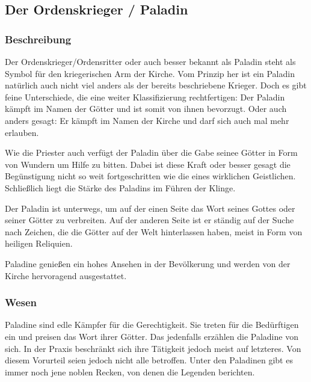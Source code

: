 \subsection{Der Ordenskrieger / Paladin}
\subsubsection{Beschreibung}
Der Ordenskrieger/Ordensritter oder auch besser bekannt als Paladin steht als Symbol für den kriegerischen 
Arm der Kirche. Vom Prinzip her ist ein Paladin natürlich auch nicht viel anders als der bereits beschriebene 
Krieger. Doch es gibt feine Unterschiede, die eine weiter Klassifizierung rechtfertigen: Der Paladin kämpft im 
Namen der Götter und ist somit von ihnen bevorzugt. Oder auch anders gesagt: Er kämpft im Namen der Kirche und 
darf sich auch mal mehr erlauben.
\par Wie die Priester auch verfügt der Paladin über die Gabe seinee Götter in Form von Wundern um Hilfe zu 
bitten. Dabei ist diese Kraft oder besser gesagt die Begünstigung nicht so weit fortgeschritten wie die eines 
wirklichen Geistlichen. Schließlich liegt die Stärke des Paladins im Führen der Klinge.
\par Der Paladin ist unterwegs, um auf der einen Seite das Wort seines Gottes oder seiner Götter zu verbreiten. 
Auf der anderen Seite ist er ständig auf der Suche nach Zeichen, die die Götter auf der Welt hinterlassen haben, 
meist in Form von heiligen Reliquien.
\par Paladine genießen ein hohes Ansehen in der Bevölkerung und werden von der Kirche hervoragend ausgestattet.
\subsubsection{Wesen}
\par Paladine sind edle Kämpfer für die Gerechtigkeit. Sie treten für die Bedürftigen ein und preisen das 
Wort ihrer Götter. Das jedenfalls erzählen die Paladine von sich. In der Praxis beschränkt sich ihre Tätigkeit 
jedoch meist auf letzteres. Von diesem Vorurteil seien jedoch nicht alle betroffen. Unter den Paladinen gibt es 
immer noch jene noblen Recken, von denen die Legenden berichten.

